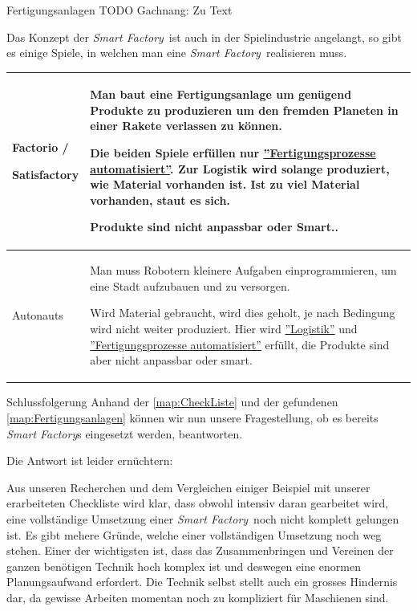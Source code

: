 \documentclass{article}
\def\SmartFactory{\textcolor{DarkestGray}{\textit{Smart Factory}}}
\begin{document}
\begin{Map}{Fertigungsanlagen}
TODO Gachnang: Zu Text\par
Das Konzept der \SmartFactory\ ist auch in der Spielindustrie angelangt, so gibt es einige Spiele, in welchen man eine \SmartFactory\ realisieren muss.
\par\medskip
\begin{tabular}{p{3.2cm}p{8cm}}\toprule
  Factorio / \par Satisfactory & Man baut eine Fertigungsanlage um genügend Produkte zu produzieren um den fremden Planeten in einer Rakete verlassen zu können. \par Die beiden Spiele erfüllen nur \hyperlink{CheckListe:Fertigungsprozess}{''Fertigungsprozesse automatisiert''}. Zur Logistik wird solange produziert, wie Material vorhanden ist. Ist zu viel Material vorhanden, staut es sich.\par Produkte sind nicht anpassbar oder Smart.. \\\midrule
  Autonauts & Man muss Robotern kleinere Aufgaben einprogrammieren, um eine Stadt aufzubauen und zu versorgen. \par Wird Material gebraucht, wird dies geholt, je nach Bedingung wird nicht weiter produziert. Hier wird \hyperlink{CheckListe:Logistik}{''Logistik''} und \hyperlink{CheckListe:Fertigungsprozess}{''Fertigungsprozesse automatisiert''} erfüllt, die Produkte sind aber nicht anpassbar oder smart. \\\bottomrule
\end{tabular}
\end{Map}

\begin{Map}{Schlussfolgerung}
Anhand der \ref{map:CheckListe} und der gefundenen \ref{map:Fertigungsanlagen} können wir nun unsere Fragestellung, ob es bereits \SmartFactory s eingesetzt werden, beantworten. \par

Die Antwort ist leider ernüchtern:\par
Aus unseren Recherchen und dem Vergleichen einiger Beispiel mit unserer erarbeiteten Checkliste wird klar, dass obwohl intensiv daran gearbeitet wird, eine vollständige Umsetzung einer \SmartFactory\ noch nicht komplett gelungen ist. Es gibt mehere Gründe, welche einer vollständigen Umsetzung noch weg stehen. Einer der wichtigsten ist, dass das Zusammenbringen und Vereinen der ganzen benötigen Technik hoch komplex ist und deswegen eine enormen Planungsaufwand erfordert. Die Technik selbst stellt auch ein grosses Hindernis dar, da gewisse Arbeiten momentan noch zu kompliziert für Maschienen sind. 

\end{Map}
\end{document}
